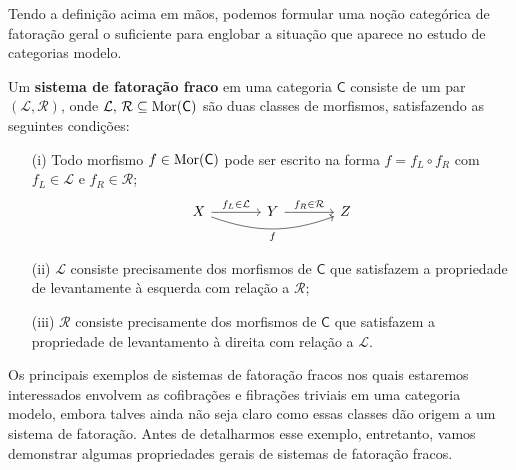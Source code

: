 Tendo a definição acima em mãos, podemos formular uma noção categórica de fatoração geral o suficiente para englobar a situação que aparece no estudo de categorias modelo.

\begin{defin}
  Um \textbf{sistema de fatoração fraco} em uma categoria $\mathsf{C}$ consiste de um par $(\mathcal{L},\mathcal{R})$, onde $\mathcal{L},\, \mathcal{R} \subseteq \mathrm{Mor}(\mathsf{C})$ são duas classes de morfismos, satisfazendo as seguintes condições:
  \begin{enumerate}
  \item[(i)] Todo morfismo $f \in \mathrm{Mor}(\mathsf{C})$ pode ser escrito na forma $f = f_{L} \circ f_{R}$ com $f_{L} \in \mathcal{L}$ e $f_{R} \in \mathcal{R}$;
    \begin{displaymath}
      \begin{tikzcd}[column sep=1.25cm]
        X
        \arrow[r, "f_{L} \in \mathcal{L}"]
        \arrow[rr, bend right=20, "f" swap]
        & Y
        \arrow[r, "f_{R} \in \mathcal{R}"]
        & Z
      \end{tikzcd}
    \end{displaymath}
    
  \item[(ii)] $\mathcal{L}$ consiste precisamente dos morfismos de $\mathsf{C}$ que satisfazem a propriedade de levantamente à esquerda com relação a $\mathcal{R}$;
    
  \item[(iii)] $\mathcal{R}$ consiste precisamente dos morfismos de $\mathsf{C}$ que satisfazem a propriedade de levantamento à direita com relação a $\mathcal{L}$.
  \end{enumerate}
\end{defin}

Os principais exemplos de sistemas de fatoração fracos nos quais estaremos interessados envolvem as cofibrações e fibrações triviais em uma categoria modelo, embora talves ainda não seja claro como essas classes dão origem a um sistema de fatoração.
Antes de detalharmos esse exemplo, entretanto, vamos demonstrar algumas propriedades gerais de sistemas de fatoração fracos.

